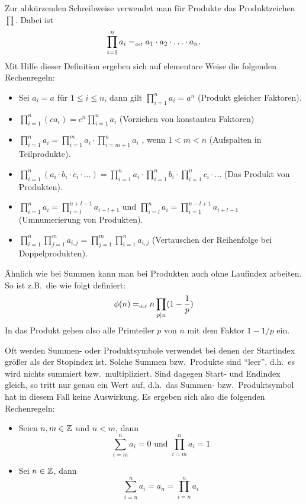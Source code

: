 Zur abkürzenden Schreibweise verwendet man für Produkte das
Produktzeichen $\prod$\index{$\prod$}. Dabei ist
\begin{displaymath}
\prod_{i=1}^n a_i =_{\mathrm{\scriptscriptstyle def}} a_1 \cdot a_2 \cdot \ldots \cdot a_n.
\end{displaymath}
Mit Hilfe dieser Definition ergeben sich auf elementare Weise die
folgenden Rechenregeln:
\begin{itemize}
%
\item Sei $a_i = a$ für $1 \le i \le n$, dann gilt $\prod\limits_{i=1}^n a_i =
  a^n$ (Produkt gleicher Faktoren).
%
\item  $\prod\limits_{i=1}^n (c a_i) = c^n \prod\limits_{i=1}^n a_i$
  (Vorziehen von konstanten Faktoren)
%
\item $\prod\limits_{i=1}^n a_i = \prod\limits_{i=1}^m a_i \cdot
  \prod\limits_{i = m + 1}^n a_i$ , wenn $1 < m < n$ (Aufspalten in Teilprodukte).
%
\item $\prod\limits_{i=1}^n (a_i \cdot b_i \cdot c_i \cdot \ldots) =
  \prod\limits_{i=1}^n a_i \cdot \prod\limits_{i=1}^n b_i \cdot
  \prod\limits_{i=1}^n c_i \cdot \ldots$ (Das Produkt von Produkten).
%
\item $\prod\limits_{i=1}^n a_i = \prod\limits_{i=l}^{n + l - 1} a_{i-l+1}$
  und $\prod\limits_{i=l}^n a_i = \prod\limits_{i=1}^{n - l + 1} a_{i + l
  - 1}$
  (Umnumerierung von Produkten).
%
\item $\prod\limits_{i=1}^n \prod\limits_{j=1}^m a_{i,j} =
  \prod\limits_{j=1}^m \prod\limits_{i=1}^n a_{i,j}$ (Vertauschen der
  Reihenfolge bei Doppelprodukten).
%
\end{itemize}
Ähnlich wie bei Summen kann man bei Produkten auch ohne Laufindex arbeiten. So ist z.B.~die
 wie folgt definiert:
\begin{displaymath}
\phi(n) =_{\mathrm{\scriptscriptstyle def}} n \prod_{p \mid n} (1 - \frac{1}{p})
\end{displaymath}
In das Produkt gehen also alle Primteiler $p$ von $n$ mit dem Faktor $1 - 1/p$ ein.

Oft werden Summen- oder Produktsymbole verwendet bei denen der Startindex 
größer als der Stopindex ist. Solche Summen bzw.~Produkte sind "`leer"', 
d.h.~es wird nichts summiert bzw.~multipliziert. Sind dagegen Start- und
Endindex gleich, so tritt nur genau ein Wert auf, d.h.~das Summen- 
bzw.~Produktsymbol hat in diesem Fall keine Auswirkung. Es ergeben sich
also die folgenden Rechenregeln:
\begin{itemize}
%
\item Seien $n, m \in \mathbb Z$ und $n < m$, dann 
\begin{displaymath}
\sum_{i=m}^n a_i = 0  \text{ und } \prod_{i = m}^n a_i = 1
\end{displaymath}
%
\item Sei $n \in \mathbb Z$, dann 
\begin{displaymath}
\sum_{i=n}^n a_i = a_n = \prod_{i = n}^n a_i
\end{displaymath}
\end{itemize}

